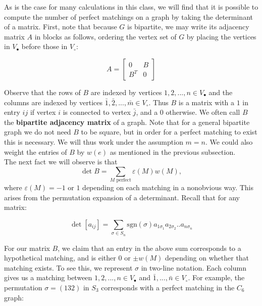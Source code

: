 \documentclass{article}
\begin{document}
	As is the case for many calculations in this class, we will find that it is possible to compute the number of perfect matchings on a graph by taking the determinant of a matrix. First, note that because $G$ is bipartite, we may write its adjacency matrix  $A$ in blocks as follows, ordering the vertex set of $G$ by placing the vertices in $V_\bullet$ before those in $V_\circ$: 
	
	$$ A = \left[
	\begin{array}{c|c}
		0 & B \\[.2em]
		\hline 
		B^T & 0		
	\end{array}
	\right] $$
	
	Observe that the rows of $B$ are indexed by vertices $ 1, 2, ..., n \in V_\bullet$ and the columns are indexed by vertices $\bar{1}, \bar{2}, ..., \bar{m} \in V_\circ$. Thus $B$ is a matrix with a $1$ in entry $ij$ if vertex $i$ is connected to vertex $\bar{j}$, and a $0$ otherwise. We often call $B$ the \textbf{bipartite adjacency matrix} of a graph. Note that for a general bipartite graph we do not need $B$ to be square, but in order for a perfect matching to exist this is necessary. We will thus work under the assumption $m=n$. We could also weight the entries of $B$ by $w(e)$ as mentioned in the previous subsection.\\ 
	
	The next fact we will observe is that $$\det B = \sum_{M \text{ perfect}} \varepsilon(M) w(M),$$ where $\varepsilon(M) = -1$ or $1$ depending on each matching in a nonobvious way. This arises from the permutation expansion of a determinant. Recall that for any matrix: 
	
	$$ \det [a_{ij}] = \sum_{\sigma \in S_n} \text{sgn}(\sigma)a_{1\sigma_1} a_{2\sigma_2} .. a_{n\sigma_n} $$ 
	
	For our matrix $B$, we claim that an entry in the above sum corresponds to a hypothetical matching, and is either $0$ or $\pm w(M)$ depending on whether that matching exists. To see this, we represent $\sigma$ in two-line notation. Each column gives us a matching between $1, 2, ..., n \in V_\bullet$ and $\bar{1} , ... , \bar{n} \in V_\circ$. For example, the permutation $\sigma = (132)$ in $S_3$ corresponds with a perfect matching in the $C_6$ graph:
	
\end{document}

